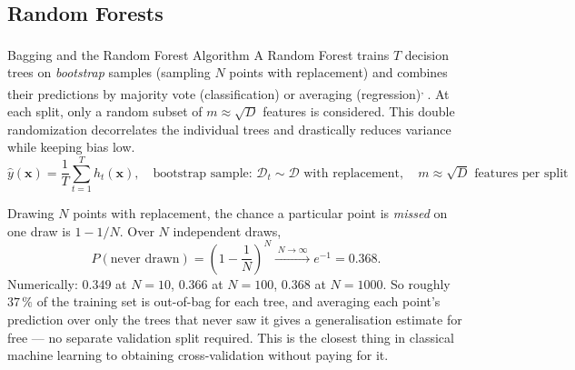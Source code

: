 \subsection{Random Forests}

\begin{v3topic}{Bagging and the Random Forest Algorithm}
    A Random Forest\textsuperscript{\cite{breimanRandomForests2001}} trains $T$ decision trees on \emph{bootstrap} samples (sampling $N$ points with replacement) and combines their predictions by majority vote (classification) or averaging (regression)\textsuperscript{\cite{breimanBaggingPredictors1996}, \cite[][pp.~586--588]{hanDataMiningConcepts2012}}. At each split, only a random subset of $m \approx \sqrt{D}$ features is considered. This double randomization decorrelates the individual trees and drastically reduces variance while keeping bias low.
\visualseparator
    \begin{equation}
        \hat{y}(\mathbf{x}) = \frac{1}{T} \sum_{t=1}^{T} h_t(\mathbf{x}),
        \quad
        \text{bootstrap sample: } \mathcal{D}_t \sim \mathcal{D} \text{ with replacement},
        \quad
        m \approx \sqrt{D} \text{ features per split}
    \end{equation}

\end{v3topic}
\begin{workedexample}
Drawing $N$ points with replacement, the chance a particular point is
\emph{missed} on one draw is $1-1/N$. Over $N$ independent draws,
\[
  P(\text{never drawn}) = \left(1-\frac{1}{N}\right)^{N}
  \xrightarrow{\;N\to\infty\;} e^{-1} = 0.368 .
\]
Numerically: $0.349$ at $N=10$, $0.366$ at $N=100$, $0.368$ at $N=1000$. So
roughly $37\,\%$ of the training set is out-of-bag for each tree, and averaging
each point's prediction over only the trees that never saw it gives a
generalisation estimate for free --- no separate validation split required.
This is the closest thing in classical machine learning to obtaining
cross-validation without paying for it.
\end{workedexample}

